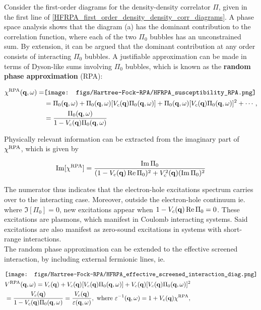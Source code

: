 {Consider the first-order diagrams for the density-density correlator $\Pi$, given in the first line of \cref{HFRPA_first_order_density_density_corr_diagrams}. A phase space analysis shows that the diagram (a) has the dominant contribution to the correlation function, where each of the two $\Pi_0$ bubbles has an unconstrained sum. By extension, it can be argued that the dominant contribution at any order consists of interacting $\Pi_0$ bubbles. A justifiable approximation can be made in terms of Dyson-like sums involving $\Pi_0$ bubbles, which is known as the \textbf{random phase approximation} (RPA)}:

\begin{equation}
    \begin{split}
        \chi^{\textnormal{RPA}}({\bf q}, \omega) =& 
\texttt{[image: figs/Hartree-Fock-RPA/HFRPA\_susceptibility\_RPA.png]} \\
    &= \Pi_0({\bf q}, \omega) + \Pi_0({\bf q}, \omega) [V_c({\bf q}) \Pi_0({\bf q}, \omega)] + \Pi_0({\bf q}, \omega) [V_c({\bf q}) \Pi_0({\bf q}, \omega)]^2 + \cdots, \\
    &= \frac{\Pi_0({\bf q}, \omega)}{1- V_{c}({\bf q}) \Pi_0({\bf q}, \omega)}
    \end{split}
\end{equation}

Physically relevant information can be extracted from the imaginary part of $\chi^{\textnormal{RPA}}$, which is given by 

\begin{equation}
    \Im[\chi^{\textnormal{RPA}}] = \frac{\Im \Pi_0}{(1 - V_c({\bf q}) \Re \Pi_0)^2 + V_c^2({\bf q}) (\Im \Pi_0)^2}
\end{equation}

The numerator thus indicates that the electron-hole excitations spectrum carries over to the interacting case. Moreover, outside the electron-hole continuum ie. where $\Im[\Pi_0] = 0$, new excitations appear when $1 - V_c({\bf q}) \Re \Pi_0 = 0$.
These excitations are plasmons, which manifest in Coulomb interacting systems. Said excitations are also manifest as zero-sound excitations in systems with short-range interactions. \\

The random phase approximation can be extended to the effective screened interaction, by including external fermionic lines, ie.

\begin{equation}
    \begin{split}
        &\texttt{[image: figs/Hartree-Fock-RPA/HFRPA\_effective\_screened\_interaction\_diag.png]} \\
        & V^{\textnormal{RPA}}({\bf q}, \omega) = V_c({\bf q}) + V_c({\bf q}) [V_c({\bf q}) \Pi_0 ({\bf q}, \omega)] + V_c({\bf q}) [V_c({\bf q}) \Pi_0 ({\bf q}, \omega)]^2 \\
        &= \frac{V_c({\bf q})}{1-V_c({\bf q}) \Pi_0({\bf q}, \omega)} = \frac{V_c({\bf q})}{\varepsilon({\bf q}, \omega)}, \textnormal{ where } \varepsilon^{-1}({\bf q}, \omega) = 1 + V_c({\bf q}) \chi^{\textnormal{RPA}},
    \end{split}
\end{equation}

